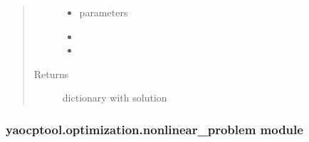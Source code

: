 \documentclass[letterpaper,10pt,english]{sphinxmanual}
\begin{document}
\begin{fulllineitems}
\begin{fulllineitems}
\begin{quote}
\begin{description}
\begin{itemize}
\item {} 
 \textendash{} parameters

\item {} 
 \textendash{} 

\item {} 
 \textendash{} 

\end{itemize}

\item[{Returns}] \leavevmode
dictionary with solution

\end{description}\end{quote}

\end{fulllineitems}


\end{fulllineitems}



\subsubsection{yaocptool.optimization.nonlinear\_problem module}
\label{\detokenize{yaocptool.optimization:module-yaocptool.optimization.nonlinear_problem}}\label{\detokenize{yaocptool.optimization:yaocptool-optimization-nonlinear-problem-module}}
\end{document}
